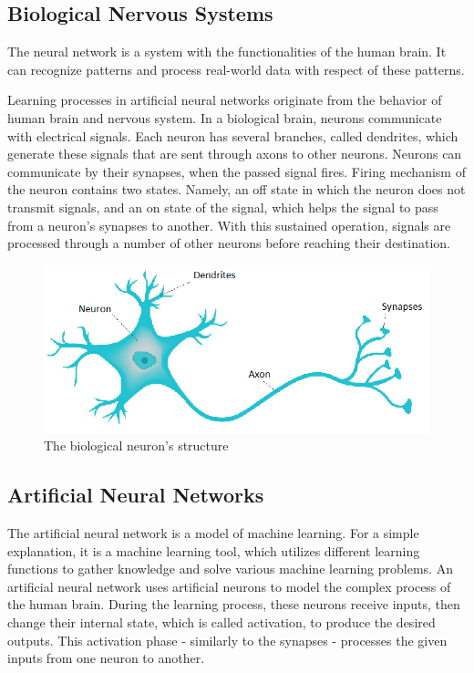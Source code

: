 \subsection{Biological Nervous Systems}

The neural network \cite{feldman2013neural} is a system with the functionalities of the human brain. It can recognize patterns and process real-world data with respect of these patterns.\smallskip

Learning processes in artificial neural networks originate from the behavior of human brain and nervous system. In a biological brain, neurons communicate with electrical signals. Each neuron has several branches, called dendrites, which generate these signals that are sent through axons to other neurons. Neurons can communicate by their synapses, when the passed signal fires. Firing mechanism of the neuron contains two states. Namely, an off state in which the neuron does not transmit signals, and an on state of the signal, which helps the signal to pass from a neuron's synapses to another. With this sustained operation, signals are processed through a number of other neurons before reaching their destination.
\begin{figure}[h]
	\centering
	\includegraphics[height=0.35\linewidth]{./figures/neuron2}
	\caption{The biological neuron's structure}
	\label{fig:neuron}
\end{figure}



\subsection{Artificial Neural Networks}

The artificial neural network \cite{priddy2005artificial, anastassiou2011intelligent} is a model of machine learning. For a simple explanation, it is a machine learning tool, which utilizes different learning functions to gather knowledge and solve various machine learning problems. An artificial neural network uses artificial neurons to model the complex process of the human brain. During the learning process, these neurons receive inputs, then change their internal state, which is called activation, to produce the desired outputs. This activation phase - similarly to the synapses - processes the given inputs from one neuron to another. \medskip

